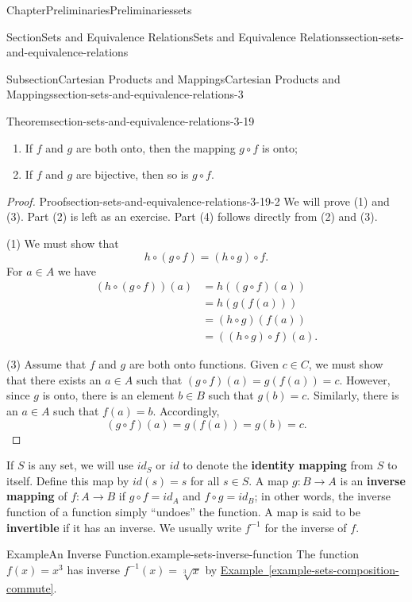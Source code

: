 \documentclass[oneside,10pt,]{book}
\newcommand{\xreffont}{\relax}
\newcommand{\terminology}[1]{\textbf{#1}}
\numberwithin{equation}{section}
\begin{document}
\begin{chapterptx}{Chapter}{Preliminaries}{}{Preliminaries}{}{}{sets}
\begin{sectionptx}{Section}{Sets and Equivalence Relations}{}{Sets and Equivalence Relations}{}{}{section-sets-and-equivalence-relations}
\begin{subsectionptx}{Subsection}{Cartesian Products and Mappings}{}{Cartesian Products and Mappings}{}{}{section-sets-and-equivalence-relations-3}
\begin{theorem}{Theorem}{}{}{section-sets-and-equivalence-relations-3-19}
\begin{enumerate}
\item{}If \(f\) and \(g\) are both onto, then the mapping \(g \circ f\) is onto;%
\item{}If \(f\) and \(g\) are bijective, then so is \(g \circ f\).%
\end{enumerate}
%
\end{theorem}
\begin{proof}{Proof}{}{section-sets-and-equivalence-relations-3-19-2}
We will prove (1) and (3). Part (2) is left as an exercise.  Part (4) follows directly from (2) and (3).%
\par
(1) We must show that%
\begin{equation*}
h \circ (g \circ f) = (h \circ g) \circ f\text{.}
\end{equation*}
For \(a \in A\) we have%
\begin{align*}
(h \circ (g \circ f))(a) & = h((g \circ f)(a))\\
& = h(g(f(a))) \\
& = (h \circ g)(f(a))\\
& = ((h \circ g) \circ f)(a)\text{.}
\end{align*}
%
\par
(3) Assume that \(f\) and \(g\) are both onto functions. Given \(c \in C\), we must show that there exists an \(a \in A\) such that \((g \circ f)(a) = g(f(a)) = c\). However, since \(g\) is onto, there is an element \(b \in B\) such that \(g(b) = c\). Similarly, there is an \(a \in A\) such that \(f(a) = b\). Accordingly,%
\begin{equation*}
(g \circ f)(a) = g(f(a)) = g(b) = c\text{.}
\end{equation*}
%
\end{proof}
If \(S\) is any set, we will use \(id_S\) or \(id\) to denote the \terminology{identity mapping} from \(S\) to itself.  Define this map by \(id(s) = s\) for all \(s \in S\).  A map \(g: B \rightarrow A\) is an \terminology{inverse mapping} of \(f: A \rightarrow B\) if \(g \circ f = id_A\) and \(f \circ g = id_B\); in other words, the inverse function of a function simply ``undoes'' the function.   A map is said to be \terminology{invertible} if it has an inverse.  We usually write \(f^{-1}\) for the inverse of \(f\). \label{section-sets-and-equivalence-relations-3-20-19}\label{section-sets-and-equivalence-relations-3-20-20}%
\begin{example}{Example}{An Inverse Function.}{example-sets-inverse-function}%
The function \(f(x) = x^3\) has inverse \(f^{-1}(x) = \sqrt[3]{x}\) by \hyperref[example-sets-composition-commute]{Example~{\xreffont\ref{example-sets-composition-commute}}}.%

\end{example}
\end{subsectionptx}
\end{sectionptx}
\end{chapterptx}
\end{document}
